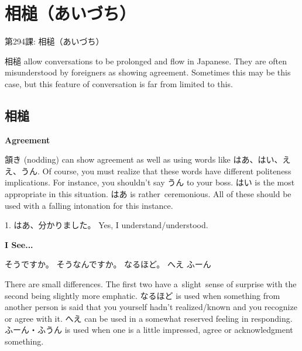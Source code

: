     
\chapter{相槌（あいづち）}

\begin{center}
\begin{Large}
第294課: 相槌（あいづち） 
\end{Large}
\end{center}
 
\par{ 相槌 allow conversations to be prolonged and flow in Japanese. They are often misunderstood by foreigners as showing agreement. Sometimes this may be this case, but this feature of conversation is far from limited to this. }
      
\section{相槌}
 
\begin{center}
\textbf{Agreement }
\end{center}

\par{ 頷き (nodding) can show agreement as well as using words like はあ、はい、ええ、うん. Of course, you must realize that these words have different politeness implications. For instance, you shouldn't say うん to your boss. はい is the most appropriate in this situation. はあ is rather ceremonious. All of these should be used with a falling intonation for this instance. }

\par{1. はあ、分かりました。 \hfill\break
Yes, I understand\slash understood. }

\begin{center}
 \textbf{I See\dothyp{}\dothyp{}\dothyp{} }
\end{center}

\par{そうですか。  そうなんですか。  なるほど。  へえ  ふーん }

\par{  There are small differences. The first two have a slight sense of surprise with the second being slightly more emphatic. なるほど is used when something from another person is said that you yourself hadn't realized\slash known and you recognize or agree with it. へえ can be used in a somewhat reserved feeling in responding. ふーん・ふうん is used when one is a little impressed, agree or acknowledgment something. }

